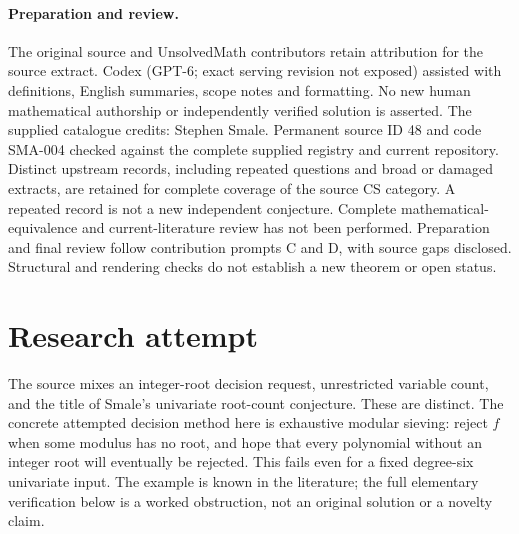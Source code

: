 \documentclass[11pt]{article}
\begin{document}
\paragraph{Preparation and review.}
The original source and UnsolvedMath contributors retain attribution for the source extract. Codex (GPT-6; exact serving revision not exposed) assisted with definitions, English summaries, scope notes and formatting. No new human mathematical authorship or independently verified solution is asserted. The supplied catalogue credits: Stephen Smale. Permanent source ID 48 and code SMA-004 checked against the complete supplied registry and current repository. Distinct upstream records, including repeated questions and broad or damaged extracts, are retained for complete coverage of the source CS category. A repeated record is not a new independent conjecture. Complete mathematical-equivalence and current-literature review has not been performed. Preparation and final review follow contribution prompts C and D, with source gaps disclosed. Structural and rendering checks do not establish a new theorem or open status.
\label{end:48}


\section{Research attempt}
The source mixes an integer-root decision request, unrestricted variable count, and the title of Smale's univariate root-count conjecture. These are distinct. The concrete attempted decision method here is exhaustive modular sieving: reject $f$ when some modulus has no root, and hope that every polynomial without an integer root will eventually be rejected. This fails even for a fixed degree-six univariate input. The example is known in the literature; the full elementary verification below is a worked obstruction, not an original solution or a novelty claim.
\end{document}
